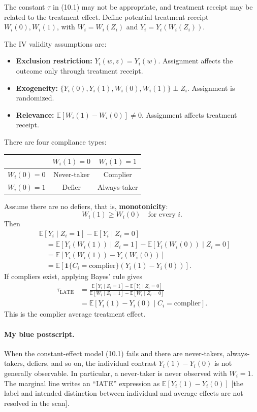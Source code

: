 The constant $\tau$ in (10.1) may not be appropriate, and treatment receipt may be related to the treatment effect. Define potential treatment receipt $W_i(0),W_i(1)$, with $W_i=W_i(Z_i)$ and $Y_i=Y_i(W_i(Z_i))$.

The IV validity assumptions are:
\begin{itemize}
 \item \textbf{Exclusion restriction:} $Y_i(w,z)=Y_i(w)$. Assignment affects the outcome only through treatment receipt.
 \item \textbf{Exogeneity:} $\{Y_i(0),Y_i(1),W_i(0),W_i(1)\}\perp Z_i$. Assignment is randomized.
 \item \textbf{Relevance:} $\mathbb E[W_i(1)-W_i(0)]\ne0$. Assignment affects treatment receipt.
\end{itemize}

There are four compliance types:
\begin{center}
\begin{tabular}{lcc}
 & $W_i(1)=0$ & $W_i(1)=1$\\\hline
 $W_i(0)=0$ & Never-taker & Complier\\
 $W_i(0)=1$ & Defier & Always-taker
\end{tabular}
\end{center}
Assume there are no defiers, that is, \textbf{monotonicity}:
\[
 W_i(1)\ge W_i(0)\quad\text{for every }i.
\]
Then
\begin{align*}
 &\mathbb E[Y_i\mid Z_i=1]-\mathbb E[Y_i\mid Z_i=0]\\
 &\quad=\mathbb E[Y_i(W_i(1))\mid Z_i=1]
 -\mathbb E[Y_i(W_i(0))\mid Z_i=0]\\
 &\quad=\mathbb E[Y_i(W_i(1))-Y_i(W_i(0))]\\
 &\quad=\mathbb E[\mathbf1\{C_i=\mathrm{complier}\}
 (Y_i(1)-Y_i(0))].
\end{align*}
If compliers exist, applying Bayes' rule gives
\begin{align*}
 \tau_{\mathrm{LATE}}
 &=\frac{\mathbb E[Y_i\mid Z_i=1]-\mathbb E[Y_i\mid Z_i=0]}
 {\mathbb E[W_i\mid Z_i=1]-\mathbb E[W_i\mid Z_i=0]}\\
 &=\mathbb E[Y_i(1)-Y_i(0)\mid C_i=\mathrm{complier}].\tag{10.3}
\end{align*}
This is the complier average treatment effect.

\paragraph{My blue postscript.}
When the constant-effect model (10.1) fails and there are never-takers, always-takers, defiers, and so on, the individual contrast $Y_i(1)-Y_i(0)$ is not generally observable. In particular, a never-taker is never observed with $W_i=1$. The marginal line writes an ``IATE'' expression as $\mathbb E[Y_i(1)-Y_i(0)]$ [the label and intended distinction between individual and average effects are not resolved in the scan].

